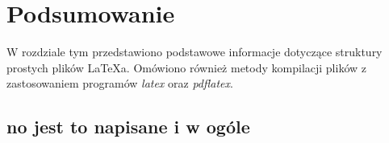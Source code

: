 \chapter{Podsumowanie}
\label{cha:podsumowanie}

W rozdziale tym przedstawiono podstawowe informacje dotyczące struktury prostych plików \LaTeX a. Omówiono również metody kompilacji plików z zastosowaniem programów \emph{latex} oraz \emph{pdflatex}.


\section{no jest to napisane i w ogóle}